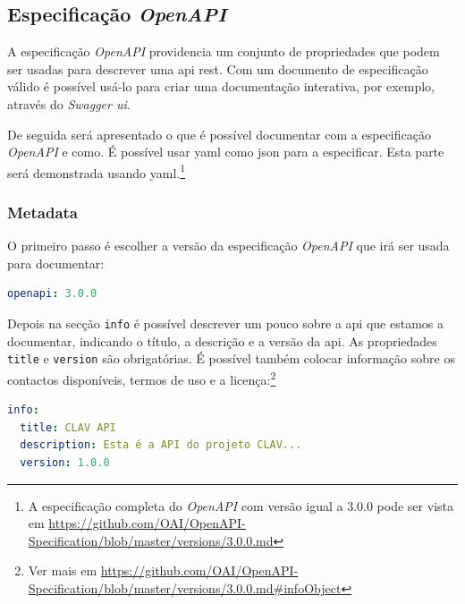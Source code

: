 \subsection{Especificação \textit{OpenAPI}}

A especificação \textit{OpenAPI} providencia um conjunto de propriedades que podem ser usadas para descrever uma \acrshort{api} \acrshort{rest}. Com um documento de especificação válido é possível usá-lo para criar uma documentação interativa, por exemplo, através do \textit{Swagger \acrshort{ui}}.

De seguida será apresentado o que é possível documentar com a especificação \textit{OpenAPI} e como. É possível usar \acrshort{yaml} como \acrshort{json} para a especificar. Esta parte será demonstrada usando \acrshort{yaml}.\footnote{A especificação completa do \textit{OpenAPI} com versão igual a 3.0.0 pode ser vista em \url{https://github.com/OAI/OpenAPI-Specification/blob/master/versions/3.0.0.md}}

\subsubsection{Metadata}
O primeiro passo é escolher a versão da especificação \textit{OpenAPI} que irá ser usada para documentar:
\begin{lstlisting}[language=yaml, caption=Exemplo de indicação da versão da especificação \textit{OpenAPI}]
openapi: 3.0.0
\end{lstlisting}

Depois na secção \texttt{info} é possível descrever um pouco sobre a \acrshort{api} que estamos a documentar, indicando o título, a descrição e a versão da \acrshort{api}. As propriedades \texttt{title} e \texttt{version} são obrigatórias. É possível também colocar informação sobre os contactos disponíveis, termos de uso e a licença:\footnote{Ver mais em \url{https://github.com/OAI/OpenAPI-Specification/blob/master/versions/3.0.0.md\#infoObject}}
\begin{lstlisting}[language=yaml, caption={Exemplo de secção \texttt{info} indicando título, descrição e versão da \acrshort{api} na especificação \textit{OpenAPI}}]
info:
  title: CLAV API
  description: Esta é a API do projeto CLAV...
  version: 1.0.0
\end{lstlisting}

\vspace{-0.7cm}

